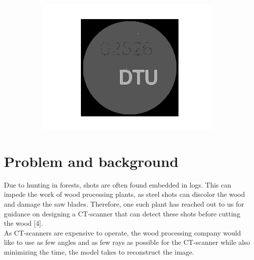 \documentclass{article}
\begin{document}
\begin{figure}[H]
\begin{subfigure}[t]{0.4\linewidth}
\end{subfigure}
\begin{subfigure}[t]{0.5\linewidth}
\centering
\includegraphics[width=\linewidth]{code/test_logo_kmeans.png}
\end{subfigure}

\vspace{10pt}
\label{fig:front_page}
\end{figure}

\clearpage
{} 
\newpage


\section{Problem and background} 
\vspace*{-0.3\baselineskip}
Due to hunting in forests, shots are often found embedded in logs. This can impede the work of wood processing plants, as steel shots can discolor the wood and damage the saw blades. Therefore, one such plant has reached out to us for guidance on designing a CT-scanner that can detect these shots before cutting the wood [4]. \\
As CT-scanners are expensive to operate, the wood processing company would like to use as few angles and as few rays as possible for the CT-scanner while also minimizing the time, the model takes to reconstruct the image.
\end{document}
